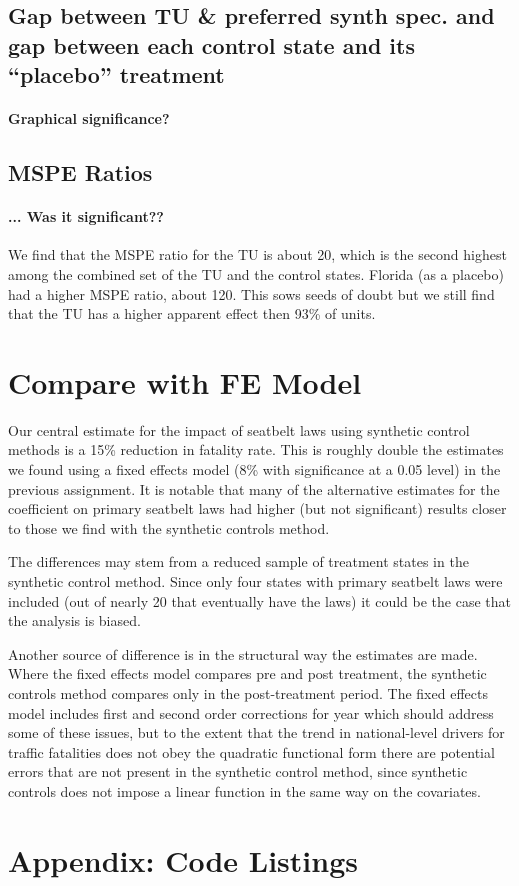 \documentclass[letterpaper, 12pt]{article}
\begin{document}
\subsection{Gap between TU \& preferred synth spec. and gap between each control state and its ``placebo'' treatment}

\paragraph{Graphical significance?}


\subsection{MSPE Ratios}

\paragraph{... Was it significant??}  We find that the MSPE ratio for the TU is about 20, which is the second highest among the combined set of the TU and the control states.  Florida (as a placebo) had a higher MSPE ratio, about 120.  This sows seeds of doubt but we still find that the TU has a higher apparent effect then 93\% of units.  


\section{Compare with FE Model}

Our central estimate for the impact of seatbelt laws using synthetic control methods is a 15\% reduction in fatality rate.  This is roughly double the estimates we found using a fixed effects model (8\% with significance at a 0.05 level) in the previous assignment.  It is notable that many of the alternative estimates for the coefficient on primary seatbelt laws had higher (but not significant) results closer to those we find with the synthetic controls method.  

The differences may stem from a reduced sample of treatment states in the synthetic control method.  Since only four states with primary seatbelt laws were included (out of nearly 20 that eventually have the laws) it could be the case that the analysis is biased.

Another source of difference is in the structural way the estimates are made.  Where the fixed effects model compares pre and post treatment, the synthetic controls method compares only in the post-treatment period.  The fixed effects model includes first and second order corrections for year which should address some of these issues, but to the extent that the trend in national-level drivers for traffic fatalities does not obey the quadratic functional form there are potential errors that are not present in the synthetic control method, since synthetic controls does not impose a linear function in the same way on the covariates.  

\section{Appendix: Code Listings}


\end{document}
